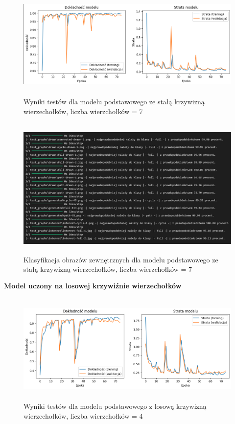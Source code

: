 \begin{figure}[ht]
	\centering
	\includegraphics[height=5.5cm]{resources/tests/images/v2/base7_img.png}
	\caption{Wyniki testów dla modelu podstawowego ze stałą krzywizną wierzechołków, liczba wierzchołków = 7}
	\label{Fig:tests-base-1}
\end{figure}
\FloatBarrier

\begin{figure}[ht]
	\centering
	\includegraphics[height=7cm]{resources/tests/images/v2/base7_txt.png}
	\caption{Klasyfikacja obrazów zewnętrznych dla modelu podstawowego ze stałą krzywizną wierzechołków, liczba wierzchołków = 7}
	\label{Fig:tests-base-2}
\end{figure}
\FloatBarrier

\textbf{Model uczony na losowej krzywiźnie wierzechołków}

\begin{figure}[ht]
	\centering
	\includegraphics[height=5.5cm]{resources/tests/images/v3/base4_img.png}
	\caption{Wyniki testów dla modelu podstawowego z losową krzywizną wierzechołków, liczba wierzchołków = 4}
	\label{Fig:tests-base-1}
\end{figure}
\FloatBarrier

